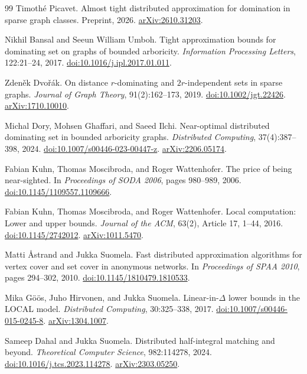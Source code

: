 \documentclass[11pt,a4paper]{article}
\theoremstyle{definition}
\theoremstyle{remark}
\begin{document}
\begin{thebibliography}{99}
Timoth{\'e} Picavet.
Almost tight distributed approximation for domination in sparse graph classes.
Preprint, 2026.
\href{https://arxiv.org/abs/2610.31203}{arXiv:2610.31203}.

Nikhil Bansal and Seeun William Umboh.
Tight approximation bounds for dominating set on graphs of bounded arboricity.
\emph{Information Processing Letters}, 122:21--24, 2017.
\href{https://doi.org/10.1016/j.ipl.2017.01.011}{doi:10.1016/j.ipl.2017.01.011}.

Zden{\v e}k Dvo{\v r}{\'a}k.
On distance $r$-dominating and $2r$-independent sets in sparse graphs.
\emph{Journal of Graph Theory}, 91(2):162--173, 2019.
\href{https://doi.org/10.1002/jgt.22426}{doi:10.1002/jgt.22426}.
\href{https://arxiv.org/abs/1710.10010}{arXiv:1710.10010}.

Michal Dory, Mohsen Ghaffari, and Saeed Ilchi.
Near-optimal distributed dominating set in bounded arboricity graphs.
\emph{Distributed Computing}, 37(4):387--398, 2024.
\href{https://doi.org/10.1007/s00446-023-00447-z}{doi:10.1007/s00446-023-00447-z}.
\href{https://arxiv.org/abs/2206.05174}{arXiv:2206.05174}.

Fabian Kuhn, Thomas Moscibroda, and Roger Wattenhofer.
The price of being near-sighted.
In \emph{Proceedings of SODA 2006}, pages 980--989, 2006.
\href{https://doi.org/10.1145/1109557.1109666}{doi:10.1145/1109557.1109666}.

Fabian Kuhn, Thomas Moscibroda, and Roger Wattenhofer.
Local computation: Lower and upper bounds.
\emph{Journal of the ACM}, 63(2), Article 17, 1--44, 2016.
\href{https://doi.org/10.1145/2742012}{doi:10.1145/2742012}.
\href{https://arxiv.org/abs/1011.5470}{arXiv:1011.5470}.

Matti {\AA}strand and Jukka Suomela.
Fast distributed approximation algorithms for vertex cover and set cover
in anonymous networks.
In \emph{Proceedings of SPAA 2010}, pages 294--302, 2010.
\href{https://doi.org/10.1145/1810479.1810533}{doi:10.1145/1810479.1810533}.

Mika G{\"o}{\"o}s, Juho Hirvonen, and Jukka Suomela.
Linear-in-$\Delta$ lower bounds in the LOCAL model.
\emph{Distributed Computing}, 30:325--338, 2017.
\href{https://doi.org/10.1007/s00446-015-0245-8}{doi:10.1007/s00446-015-0245-8}.
\href{https://arxiv.org/abs/1304.1007}{arXiv:1304.1007}.

Sameep Dahal and Jukka Suomela.
Distributed half-integral matching and beyond.
\emph{Theoretical Computer Science}, 982:114278, 2024.
\href{https://doi.org/10.1016/j.tcs.2023.114278}{doi:10.1016/j.tcs.2023.114278}.
\href{https://arxiv.org/abs/2303.05250}{arXiv:2303.05250}.


\end{thebibliography}
\end{document}

